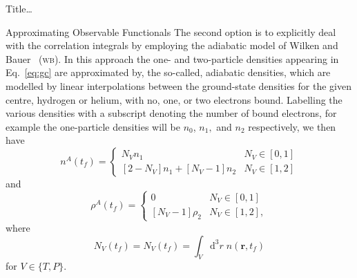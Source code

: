 \documentclass[letterpaper, 11 pt]{report}
\begin{document}
\begin{chapter}{ Title\dots \label{chap:p-he2p-he}}
\begin{section}{Approximating Observable Functionals \label{sec:phe2p-obs}}
      The second option is to explicitly deal with the correlation integrals by employing the adiabatic
      model of Wilken and Bauer~\cite{wb} (\textsc{wb}). In this approach the one- and two-particle
      densities appearing in Eq.~\eqref{eq:gc} are approximated by, the so-called, adiabatic densities,
      which are modelled by linear interpolations between the ground-state densities for the given
      centre, hydrogen or helium, with no, one, or two electrons bound. Labelling the various densities
      with a subscript denoting the number of bound electrons, for example the one-particle densities
      will be $n_0$, $ n_1,$ and $n_2$ respectively, we then have
      \begin{equation} \label{eq:n1a}
         n^{A} (t_f) = \begin{cases}
         N_V n_1 & N_V \in [0,1] \\
         \left[ 2-N_V \right] n_1 + \left[ N_V-1 \right] n_2 & N_V \in [1,2]
         \end{cases}
      \end{equation}
      and
      \begin{equation} \label{eq:p2a}
         \rho^{A} (t_f) =
         \begin{cases}
            0 & N_V \in [0,1] \\
            \left[ N_V-1 \right] \rho_2 & N_V \in [1,2],
         \end{cases}
      \end{equation}
      where
      \begin{equation} \label{eq:Nv}
         N_V(t_f) = N_V(t_f) = \int_V \mathrm{d}^3 r \; n(\mathbf{r},t_f)
      \end{equation}
      for $V \in \{T,P\}$. 


\end{section}
\end{chapter}
\end{document}
